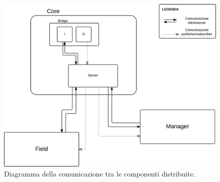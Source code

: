 \begin{figure}[htp!]
	\centering
	\includegraphics[scale=.21]{images/distribution_model}
	\caption{Diagramma della comunicazione tra le componenti distribuite.}
	\label{fig:distribuzione_analisi_workflow}
\end{figure}
